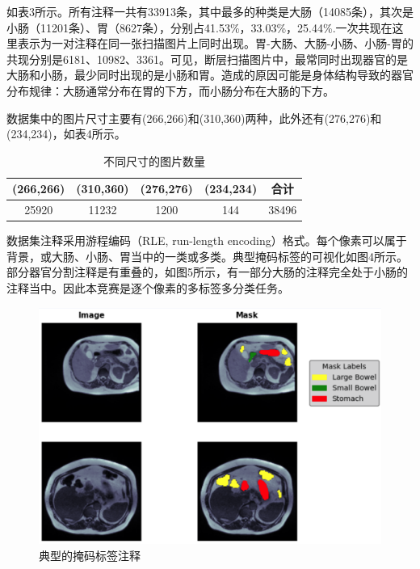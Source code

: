 \documentclass[letterpaper, 10pt, conference, twoside]{ieeeconf}
\begin{document}
如表3所示。所有注释一共有33913条，其中最多的种类是大肠（14085条），其次是小肠（11201条）、胃（8627条），分别占41.53\%，33.03\%，25.44\%.一次共现在这里表示为一对注释在同一张扫描图片上同时出现。胃-大肠、大肠-小肠、小肠-胃的共现分别是6181、10982、3361。可见，断层扫描图片中，最常同时出现器官的是大肠和小肠，最少同时出现的是小肠和胃。造成的原因可能是身体结构导致的器官分布规律：大肠通常分布在胃的下方，而小肠分布在大肠的下方。

数据集中的图片尺寸主要有(266,266)和(310,360)两种，此外还有(276,276)和(234,234)，如表4所示。

\begin{table}[htbp]
  \centering
  \caption{不同尺寸的图片数量}
  \label{tab:table4}
  \begin{tabular}{cccc|c}
    \toprule
    (266,266)&(310,360)&(276,276)&(234,234)&合计 \\
    \midrule
      25920&11232&1200&144&38496\\
    \bottomrule
   \end{tabular}
\end{table}

数据集注释采用游程编码（RLE, run-length encoding）格式。每个像素可以属于背景，或大肠、小肠、胃当中的一类或多类。典型掩码标签的可视化如图4所示。部分器官分割注释是有重叠的，如图5所示，有一部分大肠的注释完全处于小肠的注释当中。因此本竞赛是逐个像素的多标签多分类任务。

\begin{figure}[htbp]
  \centering
  \includegraphics[width = 1\linewidth]{seg_view.png}
  \caption{典型的掩码标签注释}
  \label{fig:fig4}
\end{figure}
\end{document}
